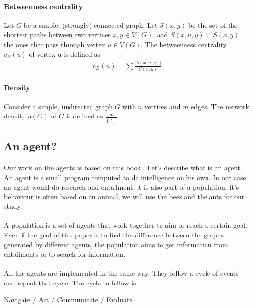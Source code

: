 \documentclass{article}
\begin{document}
		\paragraph{Betweenness centrality}
			Let $G$ be a simple, (strongly) connected graph.
			Let $S(x, y)$ be the set of the shortest paths between two vertices $x, y \in V(G)$,
			and $S(x, u, y) \subseteq S(x, y)$ the ones that pass through vertex $u \in V (G)$.
			The betweenness centrality $c_B (u)$ of vertex u is defined as
		\begin{align*}
			c_B (u) = \sum \frac{|S(x,u,y)|}{|S(x,y)|}
		\end{align*}
		\paragraph{Density}
			Consider a simple, undirected graph $G$ with $n$ vertices and $m$ edges.
			The network density $\rho(G)$ of $G$ is defined as $\frac{m}{\binom{2}{n}}$ .
	\subsection{An agent?}
		\paragraph{}
			Our work on the agents is based on this book \cite{Engelbrecht05}.
			Let's describe what is an agent.
			An agent is a small program computed to do intelligence on his own.
			In our case an agent would do research and entailment,
			it is also part of a population.
			It's behaviour is often based on an animal, we will use the bees and the ants for our study.
		\paragraph{}
			A population is a set of agents that work together to aim or reach a certain goal.
			Even if the goal of this paper is to find the difference between the graphs generated by different agents,
			the population aims to get information from entailments or to search for information.
		\paragraph{}
			All the agents are implemented in the same way.
			They follow a cycle of events and repeat that cycle.
			The cycle to follow is:
		\begin{center}
			Navigate / Act / Communicate / Evaluate
		\end{center}
\end{document}
